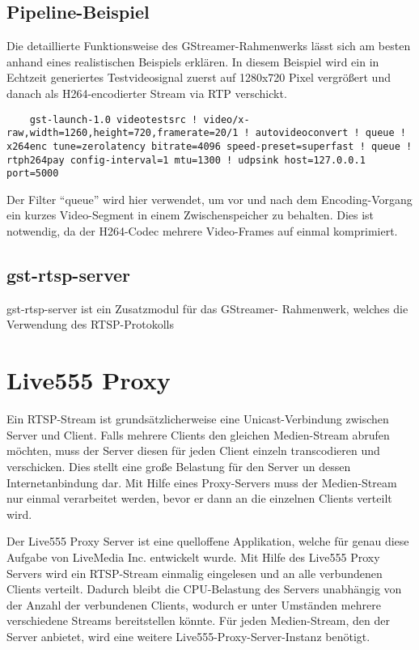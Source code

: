 \subsection{Pipeline-Beispiel}
Die detaillierte Funktionsweise des GStreamer-Rahmenwerks lässt sich am besten anhand eines realistischen Beispiels erklären.
In diesem Beispiel wird ein in Echtzeit generiertes Testvideosignal zuerst auf 1280x720 Pixel vergrößert und danach als H264-encodierter Stream via RTP verschickt.
\begin{lstlisting}
    gst-launch-1.0 videotestsrc ! video/x-raw,width=1260,height=720,framerate=20/1 ! autovideoconvert ! queue ! x264enc tune=zerolatency bitrate=4096 speed-preset=superfast ! queue ! rtph264pay config-interval=1 mtu=1300 ! udpsink host=127.0.0.1 port=5000
\end{lstlisting}
Der Filter \enquote{queue} wird hier verwendet, um vor und nach dem Encoding-Vorgang ein kurzes Video-Segment in einem Zwischenspeicher zu behalten. Dies ist notwendig, da der H264-Codec mehrere Video-Frames auf einmal komprimiert.

\subsection{gst-rtsp-server}
gst-rtsp-server ist ein Zusatzmodul für das GStreamer- Rahmenwerk, welches die Verwendung des RTSP-Protokolls 

\section{Live555 Proxy}
Ein RTSP-Stream ist grundsätzlicherweise eine Unicast-Verbindung zwischen Server und Client.
Falls mehrere Clients den gleichen Medien-Stream abrufen möchten, muss der Server diesen für jeden Client einzeln transcodieren und verschicken.
Dies stellt eine große Belastung für den Server un dessen Internetanbindung dar.
Mit Hilfe eines Proxy-Servers muss der Medien-Stream nur einmal verarbeitet werden, bevor er dann an die einzelnen Clients verteilt wird.\par

Der Live555 Proxy Server ist eine quelloffene Applikation, welche für genau diese Aufgabe von LiveMedia Inc. entwickelt wurde.
Mit Hilfe des Live555 Proxy Servers wird ein RTSP-Stream einmalig eingelesen und an alle verbundenen Clients verteilt.
Dadurch bleibt die CPU-Belastung des Servers unabhängig von der Anzahl der verbundenen Clients, wodurch er unter Umständen mehrere verschiedene Streams bereitstellen könnte. Für jeden Medien-Stream, den der Server anbietet, wird eine weitere Live555-Proxy-Server-Instanz benötigt.\par

